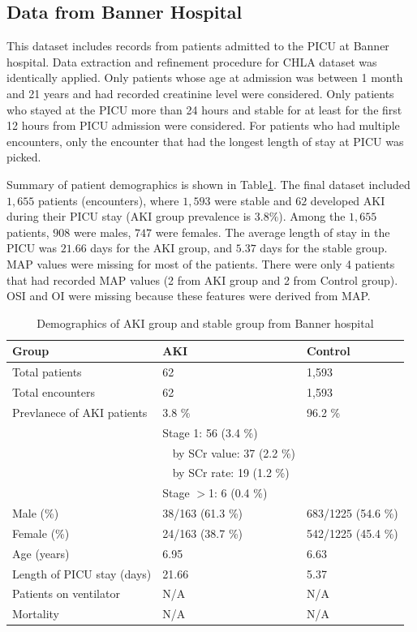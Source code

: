 \documentclass[
   technote
]{phildoc}
\newcommand{\tab}{Table}
\begin{document}
\subsection{Data from Banner Hospital}
This dataset includes records from patients admitted to the PICU at Banner hospital. Data extraction and refinement procedure for CHLA dataset was identically applied. Only patients whose age at admission was between 1 month and 21 years and had recorded creatinine level were considered. Only patients who stayed at the PICU more than 24 hours and stable for at least for the first 12 hours from PICU admission were considered. For patients who had multiple encounters, only the encounter that had the longest length of stay at PICU was picked. 

Summary of patient demographics is shown in \tab \ref{tab:demographics_banner}. The final dataset included $1,655$ patients (encounters), where $1,593$ were stable and $62$ developed AKI during their PICU stay (AKI group prevalence is 3.8$\%$). Among the $1,655$ patients,  $908$ were males, $747$ were females. The average length of stay in the PICU was $21.66$ days for the AKI group, and $5.37$ days for the stable group. MAP values were missing for most of the patients. There were only 4 patients that had recorded MAP values (2 from AKI group and 2 from Control group). OSI and OI were missing because these features were derived from MAP.

\begin{table}[!htbp] \centering \caption{Demographics of AKI group and stable group from Banner hospital} \label{tab:demographics_banner}
\begin{tabular}{| l | l | l |}
\hline
\textbf{Group} & \textbf{AKI} & \textbf{Control}\\
\hline \hline
Total patients & 62 & 1,593 \\
\hline
Total encounters	&	62	& 	1,593  \\
\hline
Prevlanece of AKI patients
& 3.8 \% & 96.2 \% \\
& Stage 1: 56 (3.4 \%) & \\
& $\;\;$ by SCr value: 37 (2.2 \%) & \\
& $\;\;$ by SCr rate: 19 (1.2 \%) & \\
& Stage $>$1: 6 (0.4 \%) & \\
\hline
Male (\%) 			& 	38/163 (61.3 \%)		&	683/1225 (54.6 \%)	\\
\hline
Female (\%)		&	24/163 (38.7 \%)		&	542/1225 (45.4 \%)	 \\
\hline
Age (years)		&	6.95 	&	6.63  \\
\hline
Length of PICU stay (days)	& 21.66 &	5.37 \\
\hline
Patients on ventilator	& N/A &	N/A \\
\hline
Mortality & N/A & N/A \\
\hline
\end{tabular}
\end{table}
\end{document}
